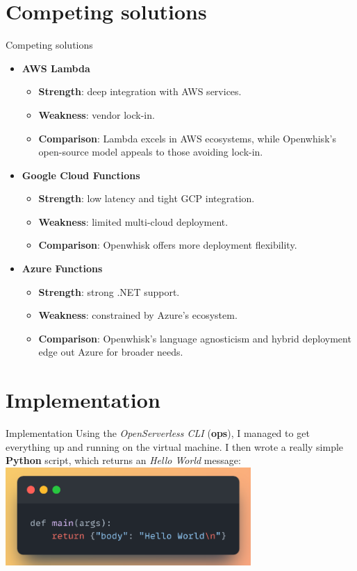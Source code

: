 \documentclass[aspectratio=169]{beamer}
\begin{document}
\section{Competing solutions}
\begin{frame}{Competing solutions}
\begin{itemize}
    \item \textbf{AWS Lambda}
    \begin{itemize}
        \item \textbf{Strength}: deep integration with AWS services.
        \item \textbf{Weakness}: vendor lock-in.
        \item \textbf{Comparison}: Lambda excels in AWS ecosystems, while Openwhisk’s open-source model appeals to those avoiding lock-in.
    \end{itemize}
    \item \textbf{Google Cloud Functions}
    \begin{itemize}
        \item \textbf{Strength}: low latency and tight GCP integration.
        \item \textbf{Weakness}: limited multi-cloud deployment.
        \item \textbf{Comparison}: Openwhisk offers more deployment flexibility.
    \end{itemize}
    \item \textbf{Azure Functions}
    \begin{itemize}
        \item \textbf{Strength}: strong .NET support.
        \item \textbf{Weakness}: constrained by Azure’s ecosystem.
        \item \textbf{Comparison}: Openwhisk’s language agnosticism and hybrid deployment edge out Azure for broader needs.
    \end{itemize}
\end{itemize}
\end{frame}

\section{Implementation}
\begin{frame}{Implementation}
Using the \textit{OpenServerless CLI} (\textbf{ops}), I managed to get everything up and running on the virtual machine. I then wrote a really simple \textbf{Python} script, which returns an \textit{Hello World} message:\vspace{14pt}\\
\centering
\includegraphics[width=0.7\textwidth]{img/code_snippet.png}
\end{frame}
\end{document}
